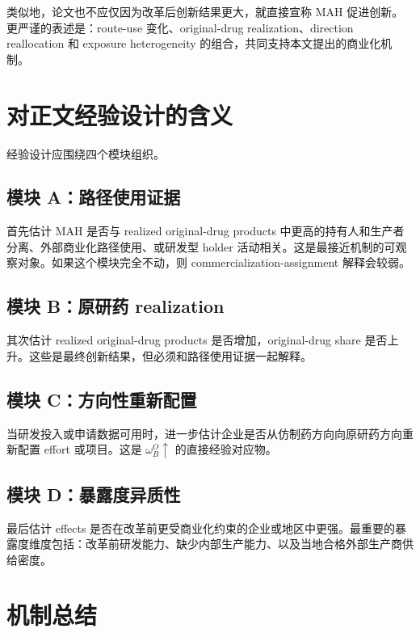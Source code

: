 \documentclass[12pt]{article}
\begin{document}
类似地，论文也不应仅因为改革后创新结果更大，就直接宣称 MAH 促进创新。更严谨的表述是：route-use 变化、original-drug realization、direction reallocation 和 exposure heterogeneity 的组合，共同支持本文提出的商业化机制。

\section{对正文经验设计的含义}

经验设计应围绕四个模块组织。

\subsection{模块 A：路径使用证据}

首先估计 MAH 是否与 realized original-drug products 中更高的持有人和生产者分离、外部商业化路径使用、或研发型 holder 活动相关。这是最接近机制的可观察对象。如果这个模块完全不动，则 commercialization-assignment 解释会较弱。

\subsection{模块 B：原研药 realization}

其次估计 realized original-drug products 是否增加，original-drug share 是否上升。这些是最终创新结果，但必须和路径使用证据一起解释。

\subsection{模块 C：方向性重新配置}

当研发投入或申请数据可用时，进一步估计企业是否从仿制药方向向原研药方向重新配置 effort 或项目。这是 $\omega_B^O\uparrow$ 的直接经验对应物。

\subsection{模块 D：暴露度异质性}

最后估计 effects 是否在改革前更受商业化约束的企业或地区中更强。最重要的暴露度维度包括：改革前研发能力、缺少内部生产能力、以及当地合格外部生产商供给密度。

\section{机制总结}
\end{document}
